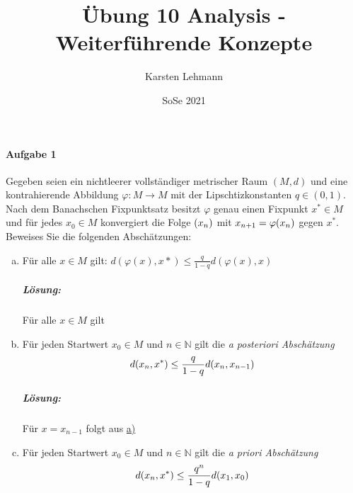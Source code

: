 \documentclass{scrreprt}
\author{Karsten Lehmann}
\date{SoSe 2021}
\title{Übung 10 Analysis - Weiterführende Konzepte}
\begin{document}
\paragraph{Aufgabe 1} Gegeben seien ein nichtleerer vollständiger metrischer
Raum $(M, d)$ und eine kontrahierende Abbildung
$\varphi \colon M \to M$ mit der Lipschtizkonstanten $q \in (0, 1)$.
Nach dem Banachschen Fixpunktsatz besitzt $\varphi$ genau einen Fixpunkt
$x^* \in M$ und für jedes $x_0 \in M$ konvergiert die Folge $\qty(x_n)$
mit $x_{n + 1} = \varphi\qty(x_n)$ gegen $x^*$.
Beweises Sie die folgenden Abschätzungen:
\begin{enumerate}[a)]
\item Für alle $x \in M$ gilt: $d(\varphi(x), x*) \leq \frac{q}{1 - q}d(\varphi(x), x)$
  \label{sec:1_a}
  \subparagraph{Lösung:} Für alle $x \in M$ gilt

\item Für jeden Startwert $x_0 \in M$ und $n \in \mathbb{N}$ gilt die
  \textit{a posteriori Abschätzung}
  \[
    d\qty(x_n, x^*) \leq \frac{q}{1 - q} d\qty(x_n, x_{n - 1})
  \]
  \label{sec:1_b}
  \subparagraph{Lösung:} Für $x = x_{n - 1}$ folgt aus \hyperref[sec:1_a]{a)}

\newpage
\item Für jeden Startwert $x_0 \in M$ und $n \in \mathbb{N}$ gilt die
  \textit{a priori Abschätzung}
  \[
    d\qty(x_n, x^*) \leq \frac{q^n}{1 - q} d\qty(x_1, x_0)
  \]


\end{enumerate}
\end{document}
